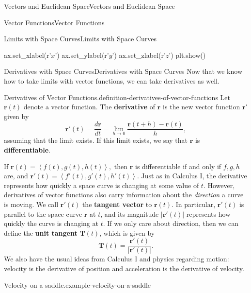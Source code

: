 \documentclass[10pt,]{book}
\newcommand{\terminology}[1]{\textbf{#1}}
\numberwithin{equation}{section}
\newcommand{\vv}[1]{\mathbf{#1}}
\newcommand{\dotprod}[1]{\left\langle #1 \right\rangle}
\begin{document}
\begin{chapterptx}{Vectors and Euclidean Space}{}{Vectors and Euclidean Space}{}{}
\begin{sectionptx}{Vector Functions}{}{Vector Functions}{}{}
\begin{subsectionptx}{Limits with Space Curves}{}{Limits with Space Curves}{}{}
\begin{sageinput}
ax.set_xlabel(r'$x$')
ax.set_ylabel(r'$y$')
ax.set_zlabel(r'$z$')
plt.show()
\end{sageinput}
\end{subsectionptx}
%
%
\typeout{************************************************}
\typeout{************************************************}
%
\begin{subsectionptx}{Derivatives with Space Curves}{}{Derivatives with Space Curves}{}{}\label{subsection-derivatives-with-space-curves}
\hypertarget{p-1045}{}%
Now that we know how to take limits with vector functions, we can take derivatives as well.%
\begin{definition}{Derivatives of Vector Functions.}{definition-derivatives-of-vector-functions}%
\hypertarget{p-1046}{}%
Let \(\vv{r}(t)\) denote a vector function. The \terminology{derivative} of \(\vv{r}\) is the new vector function \(\vv{r}'\) given by%
%
\begin{equation*}
\vv{r}'(t) = \frac{d\vv{r}}{dt} = \lim_{h\to0}\frac{\vv{r}(t+h)-\vv{r}(t)}{h},
\end{equation*}
\hypertarget{p-1047}{}%
assuming that the limit exists. If this limit exists, we say that \(\vv{r}\) is \terminology{differentiable}.%
\end{definition}
\hypertarget{p-1048}{}%
If \(\vv{r}(t) = \dotprod{f(t),g(t),h(t)},\) then \(\vv{r}\) is differentiable if and only if \(f,g,h\) are, and \(\vv{r}'(t) = \dotprod{f'(t),g'(t),h'(t)}.\) Just as in Calculus I, the derivative represents how quickly a space curve is changing at some value of \(t\). However, derivatives of vector functions also carry information about the \emph{direction} a curve is moving. We call \(\vv{r}'(t)\) the \terminology{tangent vector} to \(\vv{r}(t)\). In particular, \(\vv{r}'(t)\) is parallel to the space curve \(\vv{r}\) at \(t\), and its magnitude \(|\vv{r}'(t)|\) represents how quickly the curve is changing at \(t\). If we only care about direction, then we can define the \terminology{unit tangent} \(\vv{T}(t)\), which is given by%
%
\begin{equation*}
\vv{T}(t) = \frac{\vv{r}'(t)}{|\vv{r}'(t)|}.
\end{equation*}
\hypertarget{p-1049}{}%
We also have the usual ideas from Calculus I and physics regarding motion: velocity is the derivative of position and acceleration is the derivative of velocity.%
\begin{example}{Velocity on a saddle.}{example-velocity-on-a-saddle}%

\end{example}
\end{subsectionptx}
\end{sectionptx}
\end{chapterptx}
\end{document}
